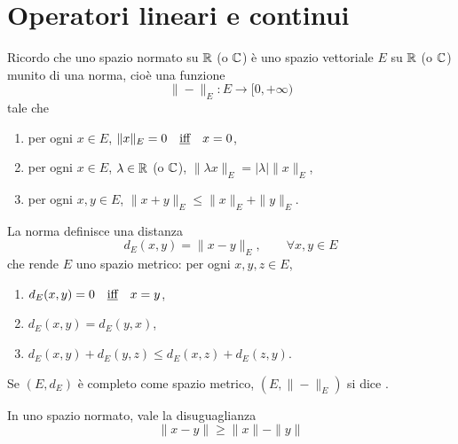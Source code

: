 \chapter{Operatori lineari e continui}
Ricordo che uno spazio normato su $\mathbb{R}$ (o $\mathbb{C}$) è uno spazio vettoriale $E$ su $\mathbb{R}$ (o $\mathbb{C}$) munito di una norma, cioè una funzione
$$
	\| - \|_E : E \to [0,+\infty)
$$
tale che
\begin{enumerate}
	\item per ogni $x \in E$, $\|x\|_E = 0 \quad\text{\underline{iff}}\quad x=0$,
	\item per ogni $x \in E$, $\lambda \in \mathbb{R}$ (o $\mathbb{C}$), $\|\lambda x \|_E = |\lambda|\|x\|_E$,
	\item per ogni $x,y \in E$, $\|x + y\|_E \leq \|x\|_E + \|y\|_E$.
\end{enumerate}
La norma definisce una distanza
$$
	d_E(x,y) = \|x-y\|_E, \qquad \forall x, y \in E
$$
che rende $E$ uno spazio metrico: per ogni $x,y,z \in E$,
\begin{enumerate}
	\item $d_E(x,y) = 0 \quad\text{\underline{iff}}\quad x=y$,
	\item $d_E(x,y) = d_E(y,x)$,
	\item $d_E(x,y) + d_E(y,z) \leq d_E(x,z) + d_E(z,y)$.
\end{enumerate}
Se $(E, d_E)$ è completo come spazio metrico, $(E, \|-\|_E)$ si dice .

\begin{lemma}
\label{lemma:reverse_triang_ineq}
	In uno spazio normato, vale la disuguaglianza
	\begin{equation}
		\|x-y\| \geq \|x\|-\|y\|
	\end{equation}
\end{lemma}

